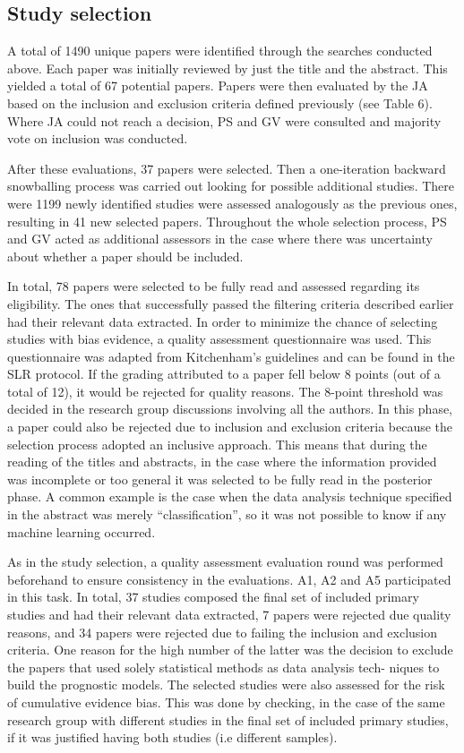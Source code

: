 \documentclass[12pt]{article}
\begin{document}
\subsection{Study selection}
A total of 1490 unique papers were identified through the searches conducted above.  Each paper was initially reviewed by just the title and the abstract. This yielded a total of 67 potential papers. Papers were then evaluated by the JA based on the inclusion and exclusion criteria defined previously (see Table 6). Where JA could not reach a decision, PS and GV were consulted and majority vote on inclusion was conducted.
\par 
After these evaluations, 37 papers were selected. Then a one-iteration backward snowballing process was carried out looking for possible additional studies. There were 1199 newly identified studies were assessed analogously as the previous ones, resulting in 41 new selected papers. Throughout the whole selection process, PS and GV acted as additional assessors in the case where there was uncertainty about whether a paper should be included.
\par 
In total, 78 papers were selected to be fully read and assessed regarding its eligibility. The ones that successfully passed the filtering criteria described earlier had their relevant data extracted. In order to minimize the chance of selecting studies with bias evidence, a quality assessment questionnaire was used. This questionnaire was adapted from Kitchenham’s guidelines and can be found in the SLR protocol. If the grading attributed to a paper fell below 8 points (out of a total of 12), it would be rejected for quality reasons. The 8-point threshold was decided in the research group discussions involving all the authors. In this phase, a paper could also be rejected due to inclusion and exclusion criteria because the selection process adopted an inclusive approach. This means that during the reading of the titles and abstracts, in the case where the information provided was incomplete or too general it was selected to be fully read in the posterior phase. A common example is the case when the data analysis technique specified in the abstract was merely “classification”, so it was not possible to know if any machine learning occurred.
\par
As in the study selection, a quality assessment evaluation round was performed beforehand to ensure consistency in the evaluations. A1, A2 and A5 participated in this task. In total, 37 studies composed the final set of included primary studies and had their relevant data extracted, 7 papers were rejected due quality reasons, and 34 papers were rejected due to failing the inclusion and exclusion criteria. One reason for the high number of the latter was the decision to exclude the papers that used solely statistical methods as data analysis tech- niques to build the prognostic models. The selected studies were also assessed for the risk of cumulative evidence bias. This was done by checking, in the case of the same research group with different studies in the final set of included primary studies, if it was justified having both studies (i.e different samples).
\end{document}
